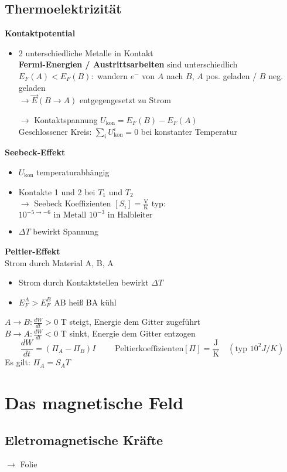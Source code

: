\documentclass[titlepage,12pt,a4paper,ngerman]{report}
\newcommand{\tx}[1]{\textrm{#1}}
\begin{document}
\subsection{Thermoelektrizität}
\textbf{Kontaktpotential}
\begin{itemize}
	\item 2 unterschiedliche Metalle in Kontakt\\
	\textbf{Fermi-Energien / Austrittsarbeiten} sind unterschiedlich\\
	$ E_F(A) < E_F(B) : $ wandern $ e^- $ von $ A $ nach $ B $, $ A $ pos. geladen / $ B $ neg. geladen \\
	$ \rightarrow \vec{E}(B\rightarrow A) $ entgegengesetzt zu Strom
	\item[$ \rightarrow $] Kontaktspannung $ U_{\tx{kon}} = E_F(B)-E_F(A) $\\
	Geschlossener Kreis: $ \sum_i U_{\tx{kon}}^i = 0 $ bei konstanter Temperatur
\end{itemize}
\textbf{Seebeck-Effekt}
\begin{itemize}
	\item $ U_{\tx{kon}} $ temperaturabhängig
	\item Kontakte 1 und 2 bei $ T_1 $ und $ T_2 $\\
	$ \rightarrow $ Seebeck Koeffizienten $ [S_i]  = \frac{\tx{V}}{\tx{K}}$ typ: $ 10^{-5 \rightarrow -6} \tx{ in Metall } 10^{-3} \tx{ in Halbleiter } $
	\item $ \Delta T $ bewirkt Spannung
\end{itemize}
\textbf{Peltier-Effekt}\\
Strom durch Material A, B, A
\begin{itemize}
	\item Strom durch Kontaktstellen bewirkt $ \Delta T $
	\item $ E^A_F > E_F^B $ AB heiß BA kühl
\end{itemize}
$ A\rightarrow B : \frac{dW}{dt} > 0$ T steigt, Energie dem Gitter zugeführt\\[5pt]
$ B\rightarrow A : \frac{dW}{dt} < 0$ T sinkt, Energie dem Gitter entzogen
$$\frac{dW}{dt} = (\Pi_A - \Pi_B)I \qquad  \tx{ Peltierkoeffizienten} [\Pi] = \frac{\tx{J}}{\tx{K}} \quad (\tx{typ } 10^2 J/K)$$
Es gilt: $ \Pi_A = S_A T$

\section{Das magnetische Feld}
\subsection{Eletromagnetische Kräfte}
 $ \rightarrow $ Folie
\end{document}
